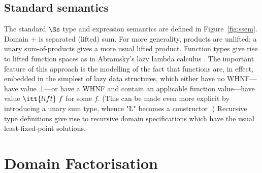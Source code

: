 \documentclass[11pt]{article}
\begin{document}
\subsection{Standard semantics}

The standard $\Ss$ type and expression semantics are defined in
Figure~\ref{fig:ssem}.  
Domain $\plus$ is separated (lifted) sum.  
For more generality, products are unlifted; a unary sum-of-products gives a
more usual lifted product.  
Function types give rise to lifted function
spaces as in Abramsky's lazy lambda calculus \cite{Abr89}.
The important feature of this approach is the modelling of the
fact that functions are, in effect, embedded in the simplest of
lazy data structures, which either have no WHNF---have value $\bot$---or
have a WHNF and contain an applicable function value---have value
$\itt{lift}~f$ for some $f$.  (This can be made even more explicit by
introducing a unary sum type, whence "\L" becomes a constructor \cite{Dav94}.)
Recursive type definitions give rise to recursive domain
specifications which have the usual least-fixed-point solutions.


\section{Domain Factorisation}
\end{document}
